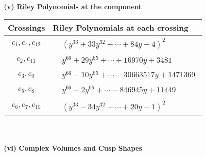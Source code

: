 \documentclass[1p]{elsarticle_modified}
\theoremstyle{definition}
\begin{document}
\newpage\renewcommand{\arraystretch}{1}
\flushleft \textbf{(v) Riley Polynomials at the component}\newline \\
\begin{tabular}{m{50pt}|m{274pt}}
Crossings & \hspace{64pt}Riley Polynomials at each crossing \\
\hline $$\begin{aligned}c_{1},c_{4},c_{12}\end{aligned}$$&$\begin{aligned}
&(y^{33}+33 y^{32}+\cdots+84 y-4)^{2}
\end{aligned}$\\
\hline $$\begin{aligned}c_{2},c_{11}\end{aligned}$$&$\begin{aligned}
&y^{66}+29 y^{65}+\cdots+16970 y+3481
\end{aligned}$\\
\hline $$\begin{aligned}c_{3},c_{9}\end{aligned}$$&$\begin{aligned}
&y^{66}-10 y^{65}+\cdots-30663517 y+1471369
\end{aligned}$\\
\hline $$\begin{aligned}c_{5},c_{8}\end{aligned}$$&$\begin{aligned}
&y^{66}-2 y^{65}+\cdots-846945 y+11449
\end{aligned}$\\
\hline $$\begin{aligned}c_{6},c_{7},c_{10}\end{aligned}$$&$\begin{aligned}
&(y^{33}-34 y^{32}+\cdots+20 y-1)^{2}
\end{aligned}$\\
\hline
\end{tabular}\\~\\
\newpage\flushleft \textbf{(vi) Complex Volumes and Cusp Shapes}
\end{document}
